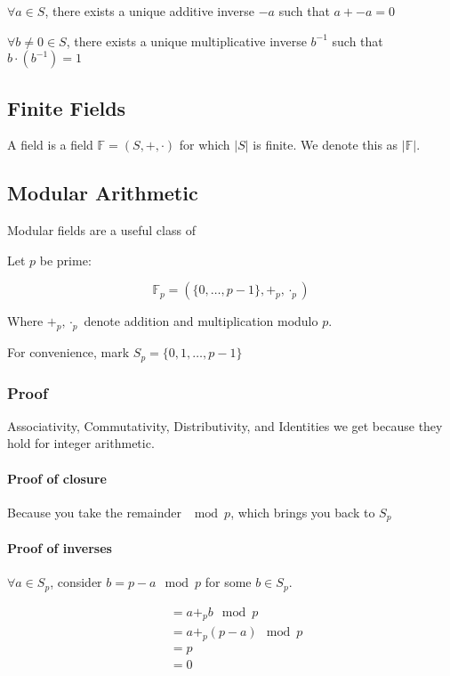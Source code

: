 \documentclass{idc_msc}
\begin{document}
\(\forall a \in S\), there exists a unique additive inverse \(-a\) such that \(a + -a = 0\)

\(\forall b \ne 0 \in S\), there exists a unique multiplicative inverse \(b^{-1}\) such that \(b \cdot (b^{-1}) = 1\)

\subsection{Finite Fields}

A  field is a field \(\mathbb{F}=(S,+,\cdot)\) for which \(|S|\) is finite.
We denote this as \(|\mathbb{F}|\).

\subsection{Modular Arithmetic}

Modular fields are a useful class of 

Let \(p\) be prime:

\[\mathbb{F}_p = (\{0,\ldots,p-1\}, +_p, \cdot_p)\]

Where \(+_p, \cdot_p\) denote addition and multiplication modulo \(p\).

For convenience, mark \(S_p=\{0,1,\ldots,p-1\}\)

\subsubsection{Proof}

Associativity, Commutativity, Distributivity, and Identities we get because they hold for integer arithmetic.

\paragraph{Proof of closure}

Because you take the remainder \(\mod p\), which brings you back to \(S_p\)

\paragraph{Proof of inverses}

\(\forall a \in S_p\), consider \(b = p - a \mod p\) for some \(b \in S_p\).

\begin{align}
& = a +_p b \mod p \\
& = a +_p (p - a) \mod p \\
& = p \\
& = 0
\end{align}
\end{document}
